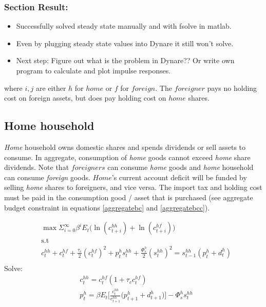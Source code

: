 \documentclass[a4paper]{article}
\begin{document}
\subsubsection{Section Result:}
\begin{itemize}
\item Successfully solved steady state manually and with fsolve in matlab. 
\item Even by plugging steady state values into Dynare it still won't solve. 
\item Next step: Figure out what is the problem in Dynare?? Or write own program to calculate and plot impulse responses. 
\end{itemize}



where $i,j$ are either $h$ for $home$ or $f$ for $foreign$. The $foreigner$ pays no holding cost on foreign assets, but does pay holding cost on $home$ shares. 


\subsection{Home household}
\emph{Home} household owns domestic shares and spends dividends or sell assets to consume. In aggregate, consumption of \emph{home} goods cannot exceed \emph{home} share dividends. Note that $foreigners$ can consume \emph{home} goods and \emph{home} household can consume \emph{foreign} goods. $Home$'s current account deficit will be funded by selling \emph{home} shares to foreigners, and vice versa. The import tax and holding cost must be paid in the consumption good / asset that is purchased (see aggregate budget constraint in equations \ref{aggregatebc} and \ref{aggregatebcc}).
 
\linebreak
\linebreak



\begin{align*}
&\max \Sigma_{i=0}^\infty \beta^i E_t \bigg(\ln(c^{hh}_{t+i})+ \ln(c^{hf}_{t+i}) \bigg)\\ &\text{s.t}\\
&c^{hh}_t+c^{hf}_t + \frac{\tau_c}{2} (c^{hf}_t)^2 + p^{h}_t s^{hh}_t+\frac{\Phi^h_s}{2}(s^{hh}_t)^2 =s^{hh}_{t-1}(p^{h}_t+d^{h}_t)\\
\end{align*}
Solve:
\begin{align}
&c^{hh}_t=c^{hf}_t(1+\tau_c c^{hf}_t)\\
&p^{h}_t=\beta E_t \bigg[\frac{c^{hh}_t}{c^{hh}_{t+1}} \bigg(  p^{h}_{t+1}+d^{h}_{t+1} \bigg) \bigg] - \Phi^h_s s^{hh}_t
\end{align}
\end{document}
